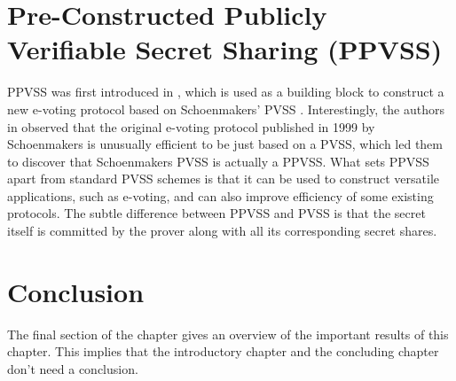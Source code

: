 

% 

  



\section{Pre-Constructed Publicly Verifiable Secret Sharing (PPVSS)}
\label{sec:ppvss}
PPVSS was first introduced in \cite{../cryptoeprint:2025/576}, which is used as a building block to 
construct a new e-voting protocol based on Schoenmakers' PVSS \cite{../5581ccd9530540479539d21d1d39ae96}. 
Interestingly, the authors in \cite{../cryptoeprint:2025/576} observed that the original e-voting protocol 
published in 1999 by Schoenmakers is unusually efficient to be just based on a PVSS, which led them to 
discover that Schoenmakers PVSS is actually a PPVSS. What sets PPVSS apart from standard PVSS schemes 
is that it can be used to construct versatile applications, such as e-voting, and can also improve 
efficiency of some existing protocols. The subtle difference between PPVSS and PVSS is that the secret 
itself is committed by the prover along with all its corresponding secret shares.

\section{Conclusion}
The final section of the chapter gives an overview of the important results
of this chapter. This implies that the introductory chapter and the
concluding chapter don't need a conclusion.

